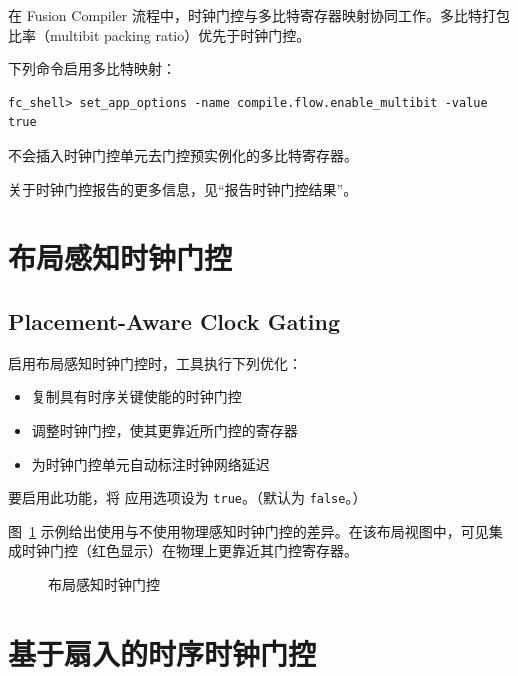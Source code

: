 在 Fusion Compiler 流程中，时钟门控与多比特寄存器映射协同工作。多比特打包比率（multibit packing ratio）优先于时钟门控。

下列命令启用多比特映射：
\begin{lstlisting}
fc_shell> set_app_options -name compile.flow.enable_multibit -value true
\end{lstlisting}

不会插入时钟门控单元去门控预实例化的多比特寄存器。

关于时钟门控报告的更多信息，见“报告时钟门控结果”。

\section{布局感知时钟门控}
\subsection*{Placement-Aware Clock Gating}

启用布局感知时钟门控时，工具执行下列优化：
\begin{itemize}
  \item 复制具有时序关键使能的时钟门控
  \item 调整时钟门控，使其更靠近所门控的寄存器
  \item 为时钟门控单元自动标注时钟网络延迟
\end{itemize}

要启用此功能，将  应用选项设为 \texttt{true}。（默认为 \texttt{false}。）

图~\ref{fig:cg-phys-aware} 示例给出使用与不使用物理感知时钟门控的差异。在该布局视图中，可见集成时钟门控（红色显示）在物理上更靠近其门控寄存器。

\begin{figure}[htbp]
\centering
{}
\caption{布局感知时钟门控}
\label{fig:cg-phys-aware}
\end{figure}

\section{基于扇入的时序时钟门控}
